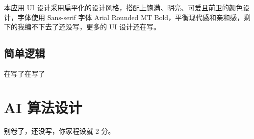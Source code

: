\documentclass{noithesis}
\begin{document}
	本应用 UI 设计采用扁平化的设计风格，搭配上饱满、明亮、可爱且前卫的颜色设计，字体使用 Sans-serif 字体 Arial Rounded MT Bold，平衡现代感和亲和感，剩下的我编不下去了还没写，更多的 UI 设计还在写。

	\subsection{简单逻辑}
	
	在写了在写了
	
	\section{AI 算法设计}
	
	别卷了，还没写，你家程设就 $2$ 分。
	
	
\end{document}
